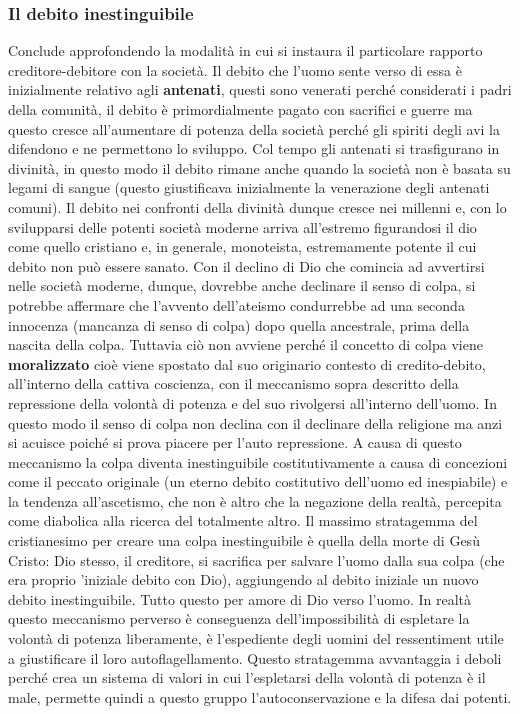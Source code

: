 \documentclass[10pt,a4paper]{article}
\begin{document}
\subsubsection{Il debito inestinguibile}
Conclude approfondendo la modalità in cui si instaura il particolare rapporto creditore-debitore con la società. Il debito che l'uomo sente verso di essa è inizialmente relativo agli \textbf{antenati}, questi sono venerati perché considerati i padri della comunità, il debito è primordialmente pagato con sacrifici e guerre ma questo cresce all'aumentare di potenza della società perché gli spiriti degli avi la difendono e ne permettono lo sviluppo. Col tempo gli antenati si trasfigurano in divinità, in questo modo il debito rimane anche quando la società non è basata su legami di sangue (questo giustificava inizialmente la venerazione degli antenati comuni). Il debito nei confronti della divinità dunque cresce nei millenni e, con lo svilupparsi delle potenti società moderne arriva all'estremo figurandosi il dio come quello cristiano e, in generale, monoteista, estremamente potente il cui debito non può essere sanato. Con il declino di Dio che comincia ad avvertirsi nelle società moderne, dunque, dovrebbe anche declinare il senso di colpa, si potrebbe affermare che l'avvento dell'ateismo condurrebbe ad una seconda innocenza (mancanza di senso di colpa) dopo quella ancestrale, prima della nascita della colpa. Tuttavia ciò non avviene perché il concetto di colpa viene \textbf{moralizzato} cioè viene spostato dal suo originario contesto di credito-debito, all'interno della cattiva coscienza, con il meccanismo sopra descritto della repressione della volontà di potenza e del suo rivolgersi all'interno dell'uomo. In questo modo il senso di colpa non declina con il declinare della religione ma anzi si acuisce poiché si prova piacere per l'auto repressione. A causa di questo meccanismo la colpa diventa inestinguibile costitutivamente a causa di concezioni come il peccato originale (un eterno debito costitutivo dell'uomo ed inespiabile) e la tendenza all'ascetismo, che non è altro che la negazione della realtà, percepita come diabolica alla ricerca del totalmente altro. Il massimo stratagemma del cristianesimo per creare una colpa inestinguibile è quella della morte di Gesù Cristo: Dio stesso, il creditore, si sacrifica per salvare l'uomo dalla sua colpa (che era proprio 'iniziale debito con Dio), aggiungendo al debito iniziale un nuovo debito inestinguibile. Tutto questo per amore di Dio verso l'uomo. In realtà questo meccanismo perverso è conseguenza dell'impossibilità di espletare la volontà di potenza liberamente, è l'espediente degli uomini del ressentiment utile a giustificare il loro autoflagellamento. Questo stratagemma avvantaggia i deboli perché crea un sistema di valori in cui l'espletarsi della volontà di potenza è il male, permette quindi a questo gruppo l'autoconservazione e la difesa dai potenti.\\
\end{document}
